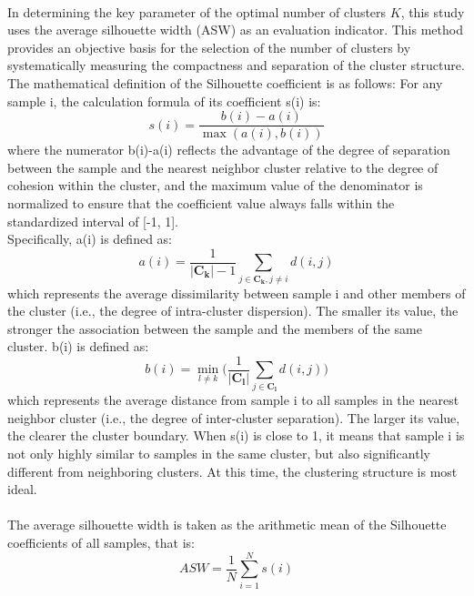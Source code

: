 \\
In determining the key parameter of the optimal number of clusters $K$, this study uses the average silhouette width (ASW) as an evaluation indicator. This method provides an objective basis for the selection of the number of clusters by systematically measuring the compactness and separation of the cluster structure. The mathematical definition of the Silhouette coefficient is as follows: For any sample i, the calculation formula of its coefficient s(i) is:\\
\begin{equation}
	s(i)=\frac{b(i)-a(i)}{\max(a(i),b(i))}
\end{equation}
where the numerator b(i)-a(i) reflects the advantage of the degree of separation between the sample and the nearest neighbor cluster relative to the degree of cohesion within the cluster, and the maximum value of the denominator is normalized to ensure that the coefficient value always falls within the standardized interval of [-1, 1]. \\
Specifically, a(i) is defined as:\\
\begin{equation}
	a(i)=\frac{1}{|\boldsymbol{C_k}|-1}\sum_{j\in \boldsymbol{C_k},j\neq i} d(i,j)
\end{equation}
which represents the average dissimilarity between sample i and other members of the cluster (i.e., the degree of intra-cluster dispersion). The smaller its value, the stronger the association between the sample and the members of the same cluster. b(i) is defined as: \\
\begin{equation}
	b(i)=\min_{l\neq k}\Bigg(\frac{1}{|\boldsymbol{C_l}|}\sum_{j\in \boldsymbol{C_l}}d(i,j)\Bigg)
\end{equation}
which represents the average distance from sample i to all samples in the nearest neighbor cluster (i.e., the degree of inter-cluster separation). The larger its value, the clearer the cluster boundary. When s(i) is close to 1, it means that sample i is not only highly similar to samples in the same cluster, but also significantly different from neighboring clusters. At this time, the clustering structure is most ideal.\\
\\
The average silhouette width is taken as the arithmetic mean of the Silhouette coefficients of all samples, that is:\\
\begin{equation}
	ASW=\frac{1}{N}\sum_{i=1}^N s(i)
\end{equation}
